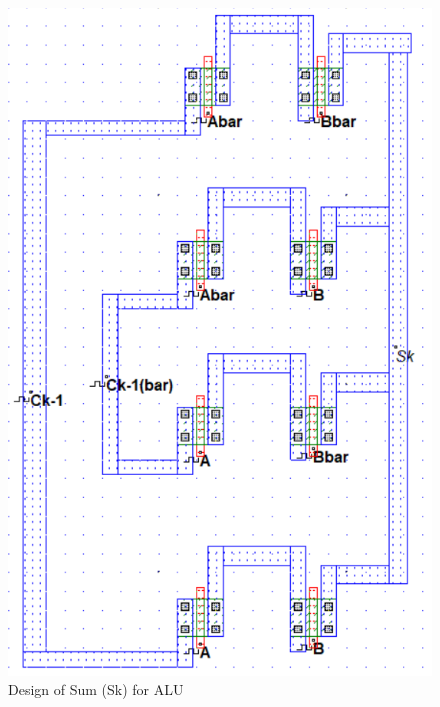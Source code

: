 \documentclass[a4paper,12pt]{article}
\begin{document}
\begin{figure}[H]
	\centering
	\includegraphics[width=0.89\linewidth]{Images/sk}
	\caption{Design of Sum (Sk) for ALU}
	\label{fig:sk}
\end{figure}
\end{document}
